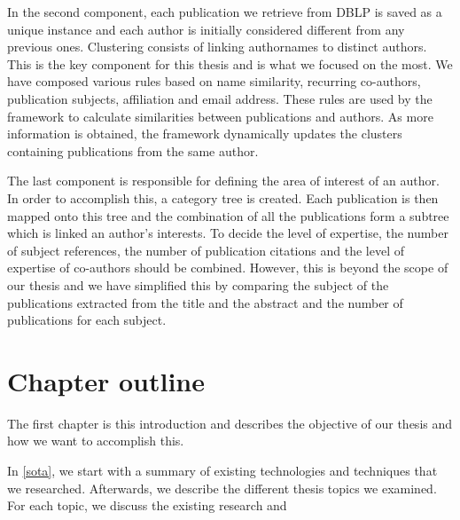 In the second component, each publication we retrieve from DBLP is saved as a unique instance and each author is initially considered different from any previous ones. Clustering consists of linking authornames to distinct authors. This is the key component for this thesis and is what we focused on the most. We have composed various rules based on name similarity, recurring co-authors, publication subjects, affiliation and email address. These rules are used by the framework to calculate similarities between publications and authors. As more information is obtained, the framework dynamically updates the clusters containing publications from the same author.

The last component is responsible for defining the area of interest of an author. In order to accomplish this, a category tree is created. Each publication is then mapped onto this tree and the combination of all the publications form a subtree which is linked an author's interests. To decide the level of expertise, the number of subject references, the number of publication citations and the level of expertise of co-authors should be combined. However, this is beyond the scope of our thesis and we have simplified this by comparing the subject of the publications extracted from the title and the abstract and the number of publications for each subject.

%
%
\section{Chapter outline}

The first chapter is this introduction and describes the objective of our thesis and how we want to accomplish this.

In \autoref{sota}, we start with a summary of existing technologies and techniques that we researched. Afterwards, we describe the different thesis topics we examined. For each topic, we discuss the existing research and 


